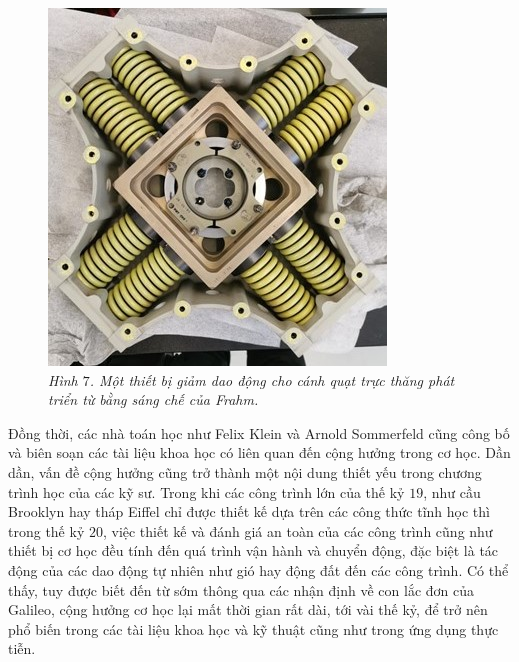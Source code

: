 \begin{multicols}{2}
	\begin{figure}[H]
		\centering
		\vspace*{-5pt}
		\captionsetup{labelformat= empty, justification=centering}
		\includegraphics[width=1\linewidth]{10}
		\caption{\small\textit{\color{timhieukhoahoc}Hình $7$. Một thiết bị giảm dao động cho cánh quạt trực thăng phát triển từ bằng sáng chế của Frahm.}}
		\vspace*{-10pt}
	\end{figure}
	Đồng thời, các nhà toán học như Felix Klein và Arnold Sommerfeld cũng công bố và biên soạn các tài liệu khoa học có liên quan đến cộng hưởng trong cơ học. Dần dần, vấn đề cộng hưởng cũng trở thành một nội dung thiết yếu trong chương trình học của các kỹ sư. Trong khi các công trình lớn của thế kỷ $19$, như cầu Brooklyn hay tháp Eiffel chỉ được thiết kế dựa trên các công thức tĩnh học thì trong thế kỷ $20$, việc thiết kế và đánh giá an toàn của các công trình cũng như thiết bị cơ học đều tính đến quá trình vận hành và chuyển động, đặc biệt là tác động của các dao động tự nhiên như gió hay động đất đến các công trình. Có thể thấy, tuy được biết đến từ sớm thông qua các nhận định về con lắc đơn của Galileo, cộng hưởng cơ học lại mất thời gian rất dài, tới vài thế kỷ, để trở nên phổ biến trong các tài liệu khoa học và kỹ thuật cũng như trong ứng dụng thực tiễn. 

\end{multicols}
